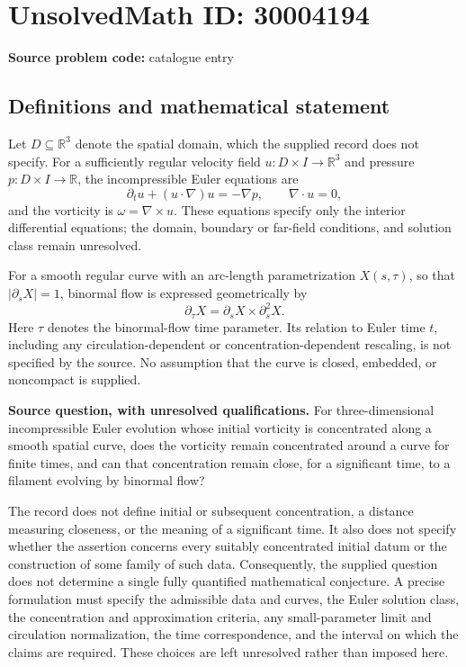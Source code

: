 \documentclass[11pt]{article}
\newcommand{\R}{\mathbb{R}}
\begin{document}
\section*{UnsolvedMath ID: 30004194}
\textbf{Source problem code:} catalogue entry
\subsection{Definitions and mathematical statement}
Let \(D\subseteq\R^3\) denote the spatial domain, which the supplied record does not specify. For a sufficiently regular velocity field \(u:D\times I\to\R^3\) and pressure \(p:D\times I\to\R\), the incompressible Euler equations are
\[
\partial_tu+(u\cdot\nabla)u=-\nabla p,\qquad \nabla\cdot u=0,
\]
and the vorticity is \(\omega=\nabla\times u\). These equations specify only the interior differential equations; the domain, boundary or far-field conditions, and solution class remain unresolved.

For a smooth regular curve with an arc-length parametrization \(X(s,\tau)\), so that \(|\partial_sX|=1\), binormal flow is expressed geometrically by
\[
\partial_\tau X=\partial_sX\times\partial_s^2X.
\]
Here \(\tau\) denotes the binormal-flow time parameter. Its relation to Euler time \(t\), including any circulation-dependent or concentration-dependent rescaling, is not specified by the source. No assumption that the curve is closed, embedded, or noncompact is supplied.

\textbf{Source question, with unresolved qualifications.} For three-dimensional incompressible Euler evolution whose initial vorticity is concentrated along a smooth spatial curve, does the vorticity remain concentrated around a curve for finite times, and can that concentration remain close, for a significant time, to a filament evolving by binormal flow?

The record does not define initial or subsequent concentration, a distance measuring closeness, or the meaning of a significant time. It also does not specify whether the assertion concerns every suitably concentrated initial datum or the construction of some family of such data. Consequently, the supplied question does not determine a single fully quantified mathematical conjecture. A precise formulation must specify the admissible data and curves, the Euler solution class, the concentration and approximation criteria, any small-parameter limit and circulation normalization, the time correspondence, and the interval on which the claims are required. These choices are left unresolved rather than imposed here.
\end{document}
